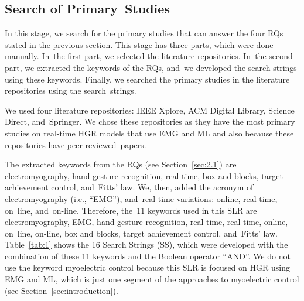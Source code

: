 \documentclass[sensors,review,accept,moreauthors,pdftex]{Definitions/mdpi}
\begin{document}
\subsection{Search of Primary~Studies} 

In this stage, we search for the primary studies that can answer the four RQs stated in the previous section. This stage has three parts, which were done manually. In~the first part, we selected the literature repositories. In~the second part, we extracted the keywords of the RQs, and~we developed the search strings using these keywords. Finally, we searched the primary studies in the literature repositories using the search~strings.   

We used four literature repositories: IEEE Xplore, ACM Digital Library, Science Direct, and~Springer. We chose these repositories as they have the most primary studies on real-time HGR models that use EMG and ML and also because these repositories have peer-reviewed~papers.



The extracted keywords from the RQs (see Section~\ref{sec:2.1}) are electromyography, hand gesture recognition, real-time, box and blocks, target achievement control, and~Fitts' law. We, then, added the acronym of electromyography (i.e., “EMG”), and~real-time variations: online, real time, on~line, and~on-line. Therefore, the~11 keywords used in this SLR are electromyography, EMG, hand gesture recognition, real time, real-time, online, on~line, on-line, box and blocks, target achievement control, and~Fitts' law.
Table~\ref{tab:1} shows the 16 Search Strings (SS), which were developed with the combination of these 11 keywords and the Boolean operator “AND”. We do not use the keyword myoelectric control because this SLR is focused on HGR using EMG and ML, which is just one segment of the approaches to myoelectric control (see Section~\ref{sec:introduction}).
\end{document}
